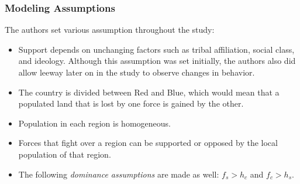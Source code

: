 \documentclass{article}
\begin{document}
\subsubsection{Modeling Assumptions}
The authors set various assumption throughout the study:
\begin{itemize}
    \item Support depends on unchanging factors such as tribal affiliation, social class, and ideology. Although this assumption was set initially, the authors also did allow leeway later on in the study to observe changes in behavior.
    \item The country is divided between Red and Blue, which would mean that a populated land that is lost by one force is gained by the other.
    \item Population in each region is homogeneous.
    \item Forces that fight over a region can be supported or opposed by the local population of that region.
    \item The following \textit{dominance assumptions} are made as well: $f_s>h_c$ and $f_c>h_s$.
\end{itemize}
\end{document}
